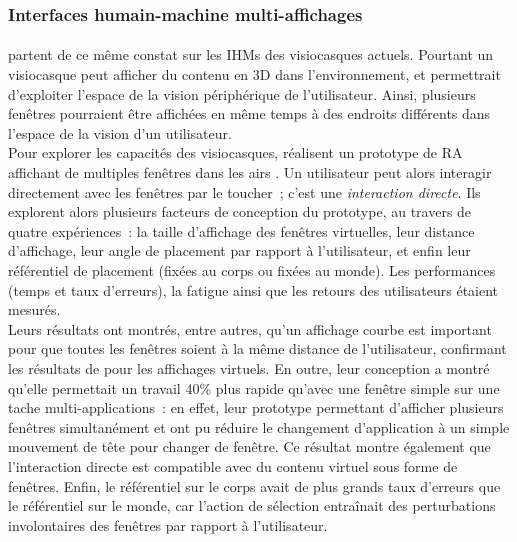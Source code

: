 \subsubsection*{Interfaces humain-machine multi-affichages}
\paragraph*{}
\citet{EnsFinneganIrani2014} partent de ce même constat sur les IHMs des visiocasques actuels. Pourtant un visiocasque peut afficher du contenu en 3D dans l'environnement, et permettrait d'exploiter l'espace de la vision périphérique de l'utilisateur. Ainsi, plusieurs fenêtres pourraient être affichées en même temps à des endroits différents dans l'espace de la vision d'un utilisateur.\\
Pour explorer les capacités des visiocasques, \citeauthor{EnsFinneganIrani2014} réalisent un prototype de RA affichant de multiples fenêtres dans les airs . Un utilisateur peut alors interagir directement avec les fenêtres par le toucher~; c'est une \emph{interaction directe}. Ils explorent alors plusieurs facteurs de conception du prototype, au travers de quatre expériences~: la taille d'affichage des fenêtres virtuelles, leur distance d'affichage, leur angle de placement par rapport à l'utilisateur, et enfin leur référentiel de placement (fixées au corps ou fixées au monde). Les performances (temps et taux d'erreurs), la fatigue ainsi que les retours des utilisateurs étaient mesurés.\\ 
Leurs résultats ont montrés, entre autres, qu'un affichage courbe est important pour que toutes les fenêtres soient à la même distance de l'utilisateur, confirmant les résultats de \citet{ShuppBallYostEtAl2006} pour les affichages virtuels. En outre, leur conception a montré qu'elle permettait un travail 40\% plus rapide qu'avec une fenêtre simple sur une tache multi-applications~: en effet, leur prototype permettant d'afficher plusieurs fenêtres simultanément et \citeauthor{EnsFinneganIrani2014} ont pu réduire le changement d'application à un simple mouvement de tête pour changer de fenêtre. Ce résultat montre également que l'interaction directe est compatible avec du contenu virtuel sous forme de fenêtres. Enfin, le référentiel sur le corps avait de plus grands taux d'erreurs que le référentiel sur le monde, car l'action de sélection entraînait des perturbations involontaires des fenêtres par rapport à l'utilisateur.\\ 
